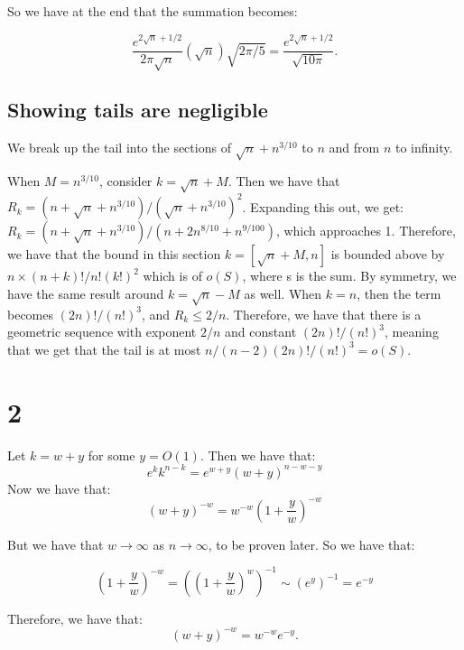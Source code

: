 \documentclass[]{article}
\begin{document}
So we have at the end that the summation becomes:

\begin{equation}
	\frac{e^{2\sqrt{n} + 1/2}}{2 \pi \sqrt{n}} (\sqrt{n}) \sqrt{2 \pi/ 5} = 
	\frac{e^{2 \sqrt{n} + 1/2}}{\sqrt{10 \pi}}.
\end{equation}


\subsection{Showing tails are negligible}
We break up the tail into the sections of $\sqrt{n} + n^{3/10}$ to $n$ and from $n$ to infinity.

When $M  = n^{3/10}$, consider $k = \sqrt{n} + M$. Then we have that
$R_k = (n + \sqrt{n}+ n^{3/10})/(\sqrt{n} + n^{3/10})^2$. Expanding this out, we get:
$R_k = (n + \sqrt{n} + n^{3/10})/(n + 2 n^{8/10} + n^{9/100})$, which approaches 1. Therefore, we have that the bound in this section $k = [\sqrt{n} + M, n]$ is bounded above by $n \times (n + k)!/n! (k!)^2$ which is of $o(S)$, where s is the sum. By symmetry, we have the same result around $k = \sqrt{n} - M$ as well. 
When $k = n$, then the term becomes $(2n)!/ (n!)^3$, and $R_k \leq 2/n$. Therefore,
we have that there is a geometric sequence with exponent $2/n$ and constant $(2n)!/(n!)^3$, meaning that we get that the tail is at most $n/(n - 2) (2n)!/(n!)^3 = o(S)$. 

\section{2}
Let $k = w + y$ for some $y = O(1)$. Then we have that:
\begin{equation}
	e^{k} k^{n - k} = e^{w + y} (w + y)^{n - w - y}
\end{equation}
Now we have that:
\begin{equation}
	(w + y)^{-w} = w^{-w} \left(1 + \frac{y}{w}\right)^{-w}
\end{equation}

But we have that $w \rightarrow \infty$ as $n \rightarrow \infty$, to be proven later. So we have that: 

\begin{equation}
	\left(1 + \frac{y}{w}\right)^{-w} = \left(\left(1 + \frac{y}{w}\right)^{w}\right)^{-1} \sim \left(e^{y}\right)^{-1} = e^{-y}
\end{equation}

Therefore, we have that:
\begin{equation}
	(w + y)^{-w} = w^{-w} e^{-y}.
\end{equation}
\end{document}
